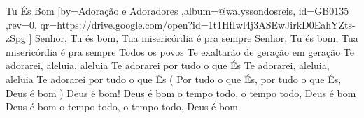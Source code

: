 \beginsong
{Tu És Bom %
}[by={Adoração e Adoradores %
},album={@walyssondosreis},
id={GB0135 %
},rev={0}, %
qr={https://drive.google.com/open?id=1t1HfIwl4j3ASEwJirkD0EahYZts-zSpg %
}]
\beginverse*
Senhor, Tu és bom, Tua misericórdia é pra sempre
Senhor, Tu és bom, Tua misericórdia é pra sempre
Todos os povos Te exaltarão de geração em geração
\endverse
\beginchorus
Te adorarei, aleluia, aleluia
Te adorarei por tudo o que És
Te adorarei, aleluia, aleluia
Te adorarei por tudo o que És
( Por tudo o que És, por tudo o que És, Deus é bom )
\endchorus
\beginverse*
Deus é bom!
\endverse
\beginverse*
Deus é bom o tempo todo, o tempo todo, Deus é bom
Deus é bom o tempo todo, o tempo todo, Deus é bom
\endverse


